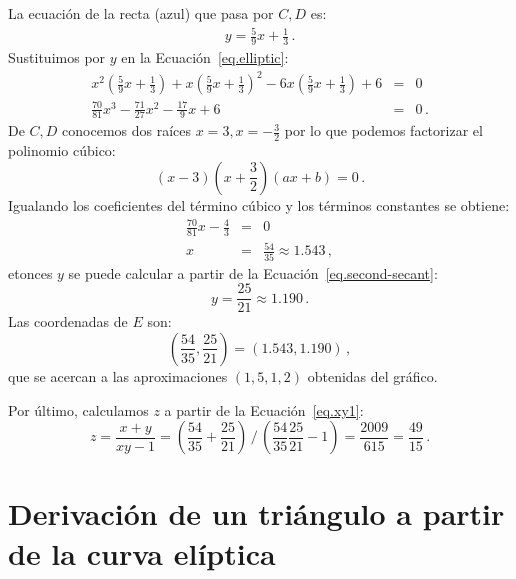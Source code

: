 La ecuación de la recta (azul) que pasa por $C,D$ es:
\begin{align}
y = \frac{5}{9}x + \frac{1}{3}\,.\label{eq.second-secant}
\end{align}
Sustituimos por $y$ en la Ecuación~\ref{eq.elliptic}:
\begin{eqnarray*}
x^2\left(\frac{5}{9}x + \frac{1}{3}\right) + x\left(\frac{5}{9}x + \frac{1}{3}\right)^2 -6x\left(\frac{5}{9}x + \frac{1}{3}\right) +6 &=&0\\
\frac{70}{81}x^3 - \frac{71}{27}x^2 - \frac{17}{9}x +6 &=&0\,.
\end{eqnarray*}
De $C,D$ conocemos dos raíces $x=3,x=-\frac{3}{2}$ por lo que podemos factorizar el polinomio cúbico:
\[
(x-3)\left(x+\frac{3}{2}\right)(ax+b)=0\,.
\]
Igualando los coeficientes del término cúbico y los términos constantes se obtiene:
\begin{eqnarray*}
\frac{70}{81}x - \frac{4}{3}&=&0\\
x&=& \frac{54}{35}\approx 1.543\,,
\end{eqnarray*}
etonces $y$ se puede calcular a partir de la Ecuación~\ref{eq.second-secant}:
\[
y=\frac{25}{21}\approx 1.190\,.
\]
Las coordenadas de $E$ son:
\[
\left(\frac{54}{35}, \frac{25}{21}\right)=(1.543,1.190)\,,
\]
que se acercan a las aproximaciones $(1,5,1,2)$ obtenidas del gráfico.

Por último, calculamos $z$ a partir de la Ecuación~\ref{eq.xy1}:
\[
z=\frac{x+y}{xy-1}=%
\displaystyle\left(\frac{54}{35} + \frac{25}{21}\right)%
 \, \bigg/ \,%
\displaystyle\left(\frac{54}{35}\frac{25}{21}-1\right)=%
\frac{2009}{615} = \frac{49}{15}\,.
\]

\section{Derivación de un triángulo a partir de la curva elíptica}

